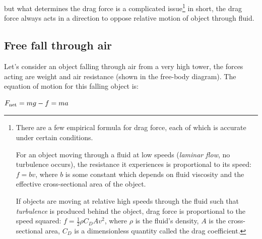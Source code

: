 but what determines the drag force is a complicated issue\footnote[][-4cm]{There are a few empirical formula for drag force, each of which is accurate under certain conditions.
	
For an object moving through a fluid at low speeds (\emph{laminar flow}, no turbulence occurs), the resistance it experiences is proportional to its speed: $f=bv$, where $b$ is some constant which depends on fluid viscosity and the effective cross-sectional area of the object.
	
If objects are moving at relative high speeds through the fluid such that \emph{turbulence} is produced behind the object, drag force is proportional to the speed squared: $ f = \frac{1}{2} \rho C_D A v^2$, where $\rho$ is the fluid's density, $A$ is the cross-sectional area, $C_D$ is a dimensionless quantity called the drag coefficient.}
in short, the drag force always acts in a direction to oppose relative motion of object through fluid.

\subsection*{Free fall through air}

\begin{marginfigure}
	\vspace*{-16pt}
	\centering
	\vspace*{-16pt}
\end{marginfigure}

Let's consider an object falling through air from a very high tower, the forces acting are weight and air resistance (shown in the free-body diagram). The equation of motion for this falling object is:

{
	\centering
	
	$ F_\text{net} = mg - f = ma $
	
}

